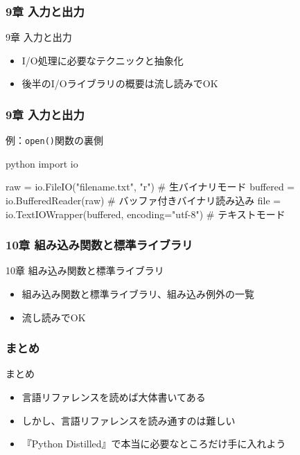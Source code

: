 \documentclass[aspectratio=169,dvipdfmx,12pt,notheorems]{beamer}
\theoremstyle{definition}
\begin{document}
\begin{frame}\frametitle{9章 入力と出力}

\begin{block}{9章 入力と出力}
\begin{itemize}
\item I/O処理に必要なテクニックと抽象化
\item 後半のI/Oライブラリの概要は流し読みでOK
\end{itemize}
\end{block}

\end{frame}

\begin{frame}[fragile]\frametitle{9章 入力と出力}

\begin{exampleblock}{例：\texttt{open()}関数の裏側}
\begin{pygments}{python}
import io

raw = io.FileIO("filename.txt", "r")  # 生バイナリモード
buffered = io.BufferedReader(raw)  # バッファ付きバイナリ読み込み
file = io.TextIOWrapper(buffered, encoding="utf-8")  # テキストモード
\end{pygments}
\end{exampleblock}

\end{frame}

\begin{frame}\frametitle{10章 組み込み関数と標準ライブラリ}

\begin{block}{10章 組み込み関数と標準ライブラリ}
\begin{itemize}
\item 組み込み関数と標準ライブラリ、組み込み例外の一覧
\item 流し読みでOK
\end{itemize}
\end{block}

\end{frame}

\begin{frame}\frametitle{まとめ}

\begin{block}{まとめ}
\begin{itemize}
\item 言語リファレンスを読めば大体書いてある
\item しかし、言語リファレンスを読み通すのは難しい
\item 『Python Distilled』で本当に必要なところだけ手に入れよう
\end{itemize}
\end{block}

\end{frame}
\end{document}
